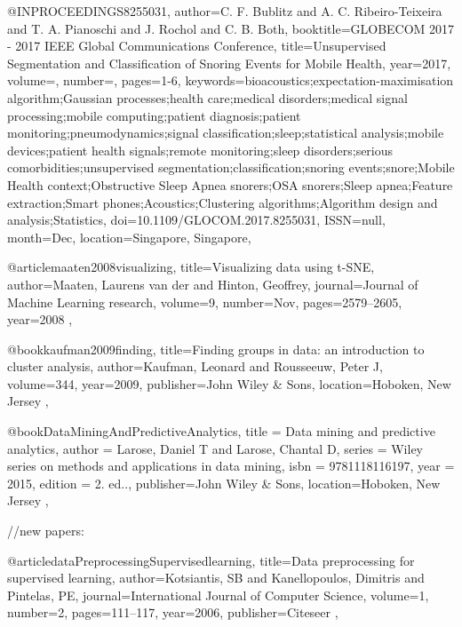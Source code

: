 @INPROCEEDINGS{8255031, 
author={C. F. {Bublitz} and A. C. {Ribeiro-Teixeira} and T. A. {Pianoschi} and J. {Rochol} and C. B. {Both}}, 
booktitle={GLOBECOM 2017 - 2017 IEEE Global Communications Conference}, 
title={Unsupervised Segmentation and Classification of Snoring Events for Mobile Health}, 
year={2017}, 
volume={}, 
number={}, 
pages={1-6}, 
keywords={bioacoustics;expectation-maximisation algorithm;Gaussian processes;health care;medical disorders;medical signal processing;mobile computing;patient diagnosis;patient monitoring;pneumodynamics;signal classification;sleep;statistical analysis;mobile devices;patient health signals;remote monitoring;sleep disorders;serious comorbidities;unsupervised segmentation;classification;snoring events;snore;Mobile Health context;Obstructive Sleep Apnea snorers;OSA snorers;Sleep apnea;Feature extraction;Smart phones;Acoustics;Clustering algorithms;Algorithm design and analysis;Statistics}, 
doi={10.1109/GLOCOM.2017.8255031}, 
ISSN={null}, 
month={Dec},
location={Singapore, Singapore}},

@article{maaten2008visualizing,
  title={Visualizing data using t-SNE},
  author={Maaten, Laurens van der and Hinton, Geoffrey},
  journal={Journal of Machine Learning research},
  volume={9},
  number={Nov},
  pages={2579--2605},
  year={2008}
},

@book{kaufman2009finding,
  title={Finding groups in data: an introduction to cluster analysis},
  author={Kaufman, Leonard and Rousseeuw, Peter J},
  volume={344},
  year={2009},
  publisher={John Wiley \& Sons},
  location={Hoboken, New Jersey}
},

@book{DataMiningAndPredictiveAnalytics,
title = {Data mining and predictive analytics},
author = {Larose, Daniel T and Larose, Chantal D},
series = {Wiley series on methods and applications in data mining},
isbn = {9781118116197},
year = {2015},
edition = {2. ed..},
publisher={John Wiley \& Sons},
location={Hoboken, New Jersey}
},











//new papers:

@article{dataPreprocessingSupervisedlearning,
  title={Data preprocessing for supervised learning},
  author={Kotsiantis, SB and Kanellopoulos, Dimitris and Pintelas, PE},
  journal={International Journal of Computer Science},
  volume={1},
  number={2},
  pages={111--117},
  year={2006},
  publisher={Citeseer}
},


